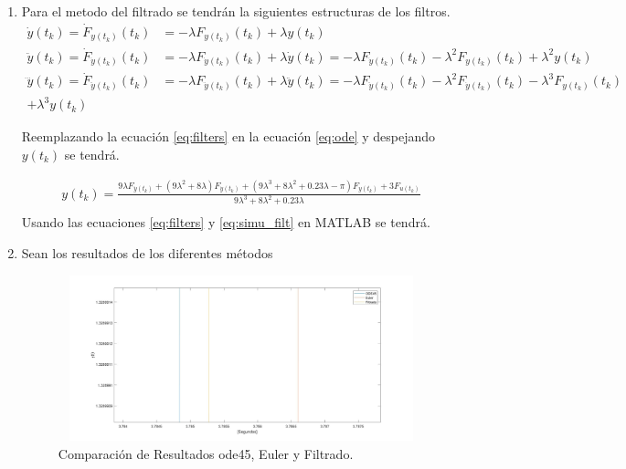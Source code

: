 \documentclass[12pt]{article}
\begin{document}
\begin{enumerate}
\begin{enumerate}
        
        \item Para el metodo del filtrado se tendrán la siguientes estructuras de los filtros.
        \begin{equation}
            \begin{split}
                \dot{y}(t_k)=\dot{F}_{y(t_{k})}(t_k)&=-\lambda F_{y(t_{k})}(t_{k})+\lambda y(t_{k})\\
                \ddot{y}(t_k)=\dot{F}_{\dot{y}(t_{k})}(t_k)&=-\lambda F_{\dot{y}(t_{k})}(t_{k})+\lambda \dot{y}(t_{k})=-\lambda F_{\dot{y}(t_{k})}(t_{k})-\lambda^2 F_{y(t_{k})}(t_{k})+\lambda^2y(t_{k})\\
                \dddot{y}(t_k)=\dot{F}_{\ddot{y}(t_{k})}(t_k)&=-\lambda F_{\ddot{y}(t_{k})}(t_{k})+\lambda \ddot{y}(t_{k})=-\lambda F_{\ddot{y}(t_{k})}(t_{k})-\lambda^2 F_{\dot{y}(t_{k})}(t_{k})-\lambda^3 F_{y(t_{k})}(t_{k})\\+ \lambda^3y(t_{k})
            \end{split}
            \label{eq:filters}
        \end{equation}

        Reemplazando la ecuación \ref{eq:filters} en la ecuación \ref{eq:ode} y despejando $y({t_k})$ se tendrá. 

        \begin{equation}
            \begin{split}
                y(t_{k})=\frac{9\lambda F_{\ddot{y}(t_{k})}+(9\lambda^2+8\lambda)F_{\dot{y}(t_{k})}+(9\lambda^3+8\lambda^2+0.23\lambda-\pi)F_{y(t_{k})}+3F_{u(t_{k})}}{9\lambda^3+8\lambda^2+0.23\lambda}\\
            \end{split}
            \label{eq:simu_filt}
        \end{equation}
        Usando las ecuaciones \ref{eq:filters} y \ref{eq:simu_filt} en MATLAB se tendrá.
        
        
        \item Sean los resultados de los diferentes métodos
        \begin{figure}[h]
            \centering
            \includegraphics[width=15cm,height=4.8cm]{IMAGENES/12.jpg}
            \caption{Comparación de Resultados ode45, Euler y Filtrado.}
        \end{figure}
    \end{enumerate}
\end{enumerate}
\end{document}
